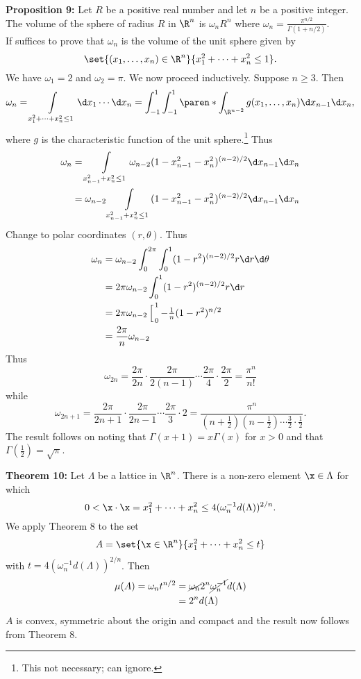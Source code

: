 \textbf{Proposition 9:} Let $R$ be a positive real number and let $n$ be a positive integer.  The volume of the sphere of radius $R$ in $\R^n$ is $\omega_n R^n$ where $\omega_n=\frac{\pi^{n/2}}{\Gamma(1+n/2)}$. \\
\pf If suffices to prove that $\omega_n$ is the volume of the unit sphere given by
\[ \set{(x_1,\dotsc,x_n)\in\R^n}{x_1^2+\dotsb+x_n^2\leq1} . \]
We have $\omega_1=2$ and $\omega_2=\pi$.  We now proceed inductively.  Suppose $n\geq3$.  Then
\[ \omega_n = \int\limits_{x_1^2+\dotsb+x_n^2\leq1}\d x_1\dotsm\d x_n = \int_{-1}^1\int_{-1}^1\paren*{\int_{\R^{n-2}} g(x_1,\dotsc,x_{n})}\d x_{n-1}\d x_n , \]
where $g$ is the characteristic function of the unit sphere.\footnote{This not necessary; can ignore.}  Thus
\begin{align*}
\omega_n
&= \int\limits_{x_{n-1}^2+x_n^2\leq1}\omega_{n-2}(1-x_{n-1}^2-x_n^2)^{(n-2)/2}\d x_{n-1}\d x_n \\
&= \omega_{n-2}\int\limits_{x_{n-1}^2+x_n^2\leq1}(1-x_{n-1}^2-x_n^2)^{(n-2)/2}\d x_{n-1}\d x_n 
\end{align*}
Change to polar coordinates $(r,\theta)$. Thus
\begin{align*}
\omega_n &= \omega_{n-2} \int_0^{2\pi}\int_0^1 (1-r^2)^{(n-2)/2} r\d r\d\theta \\
&= 2\pi\omega_{n-2} \int_0^1 (1-r^2)^{(n-2)/2} r \d r \\
&= 2\pi\omega_{n-2} \left[ \vphantom{-\tfrac1n(1-r^2)^{n/2}} \right._0^1 {-\tfrac1n(1-r^2)^{n/2}} \\
&= \frac{2\pi}{n}\omega_{n-2}
\end{align*}
Thus
\[ \omega_{2n} = \frac{2\pi}{2n}\cdot\frac{2\pi}{2(n-1)}\dotsm\frac{2\pi}{4}\cdot\frac{2\pi}{2}=\frac{\pi^n}{n!} \]
while
\[ \omega_{2n+1} = \frac{2\pi}{2n+1}\cdot\frac{2\pi}{2n-1}\dotsm\frac{2\pi}{3}\cdot2 = \frac{\pi^n}{(n+\frac12)(n-\frac12)\dotsm\frac{3}{2}\cdot\frac{1}{2}} . \]
The result follows on noting that $\Gamma(x+1)=x\Gamma(x)$ for $x>0$ and that $\Gamma(\frac12)=\sqrt\pi$.

\textbf{Theorem 10:} Let $\Lambda$ be a lattice in $\R^n$.  There is a non-zero element $\x\in\Lambda$ for which 
\[ 0<\x\cdot\x=x_1^2+\dotsb+x_n^2 \leq 4(\omega^{-1}_n d(\Lambda))^{2/n} . \]
\pf We apply Theorem 8 to the set
\[ A = \set{\x\in\R^n}{x_1^2+\dotsb+x_n^2\leq t} \]
with $t=4(\omega^{-1}_n d(\Lambda))^{2/n}$.  Then
\begin{align*}
\mu(A) = \omega_n t^{n/2} &= \cancel{\omega_n} 2^n \cancel{\omega_n^{-1}} d(\Lambda) \\
&= 2^n d(\Lambda)
\end{align*}
$A$ is convex, symmetric about the origin and compact and the result now follows from Theorem 8.